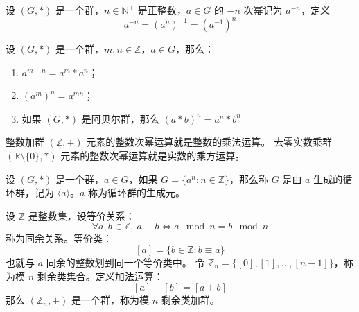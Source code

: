 \begin{definition}[群元素的负整数次幂运算]
    设 $(G, *)$ 是一个群，$n\in\mathbb{N}^+$ 是正整数，$a\in G$ 的 $-n$ 次幂记为 $a^{-n}$，定义
    \[
        a^{-n} = (a^n)^{-1} = (a^{-1})^n
    \]
\end{definition}

\begin{proposition}[群元素的整数次幂运算的性质]
    设 $(G, *)$ 是一个群，$m, n\in\mathbb{Z}$，$a\in G$，那么：
    \begin{enumerate}
        \item $a^{m+n} = a^m * a^n$；
        \item $(a^m)^n = a^{mn}$；
        \item 如果 $(G, *)$ 是阿贝尔群，那么 $(a * b)^n = a^n * b^n$
    \end{enumerate}
\end{proposition}

\begin{note}
    整数加群 $(\mathbb{Z}, +)$ 元素的整数次幂运算就是整数的乘法运算。
    去零实数乘群 $(\mathbb{R}\setminus\{0\}, *)$ 元素的整数次幂运算就是实数的乘方运算。
\end{note}
\vspace{1em}

\begin{definition}
    设 $(G, *)$ 是一个群，$a\in G$，如果 $G = \{a^n : n\in\mathbb{Z}\}$，那么称 $G$ 是由 $a$ 生成的循环群，记为 $\langle a \rangle$。$a$ 称为循环群的生成元。
    \label{def:cyclic_group}
\end{definition}

\begin{definition}[模 n 剩余类加群]
    设 $\mathbb{Z}$ 是整数集，设等价关系：
    \[
        \forall a,b \in \mathbb{Z},\ a\equiv b \iff a \mod n = b \mod n
    \]
    称为同余关系。等价类：
    \[
        [a] = \{b\in\mathbb{Z} : b \equiv a\}
    \]
    也就与 $a$ 同余的整数划到同一个等价类中。
    令 $\mathbb{Z}_n = \{[0],[1],\ldots,[n-1]\}$，称为模 $n$ 剩余类集合。定义加法运算：
    \[
        [a] + [b] = [a + b]
    \]
    那么 $(\mathbb{Z}_n, +)$ 是一个群，称为模 $n$ 剩余类加群。
\end{definition}


